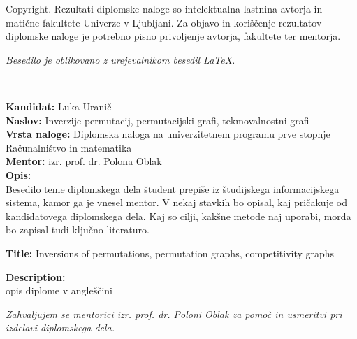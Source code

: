 \documentclass[a4paper, 12pt]{book}
\newcommand{\ttitle}{Inverzije permutacij, permutacijski grafi, tekmovalnostni grafi}
\newcommand{\ttitleEn}{Inversions of permutations, permutation graphs, competitivity graphs}
\newcommand{\clearemptydoublepage}{\newpage{\pagestyle{empty}\cleardoublepage}}
\begin{document}
\thispagestyle{empty}
\vspace*{8cm}

\noindent
{\sc Copyright}. 
Rezultati diplomske naloge so intelektualna lastnina avtorja in matične fakultete Univerze v Ljubljani.
Za objavo in koriščenje rezultatov diplomske naloge je potrebno pisno privoljenje avtorja, fakultete ter mentorja.

\begin{center}
\mbox{}\vfill
\emph{Besedilo je oblikovano z urejevalnikom besedil \LaTeX.}
\end{center}
\clearemptydoublepage

\thispagestyle{empty}
\
\vfill

\bigskip
\noindent\textbf{Kandidat:} Luka Uranič\\
\noindent\textbf{Naslov:} \ttitle\\
\noindent\textbf{Vrsta naloge:} Diplomska naloga na univerzitetnem programu prve stopnje Računalništvo in matematika \\
\noindent\textbf{Mentor:}  izr. prof. dr. Polona Oblak\\

\bigskip
\noindent\textbf{Opis:}\\
Besedilo teme diplomskega dela študent prepiše iz študijskega informacijskega sistema, kamor ga je vnesel mentor. 
V nekaj stavkih bo opisal, kaj pričakuje od kandidatovega diplomskega dela. 
Kaj so cilji, kakšne metode naj uporabi, morda bo zapisal tudi ključno literaturo.

\bigskip
\noindent\textbf{Title:} \ttitleEn

\bigskip
\noindent\textbf{Description:}\\
opis diplome v angleščini

\vfill



\vspace{2cm}

\clearemptydoublepage

\thispagestyle{empty}\mbox{}\vfill\null\it%
\noindent
Zahvaljujem se mentorici izr. prof. dr. Poloni Oblak za pomoč in usmeritvi pri izdelavi diplomskega dela.\\
\rm\normalfont
\end{document}
